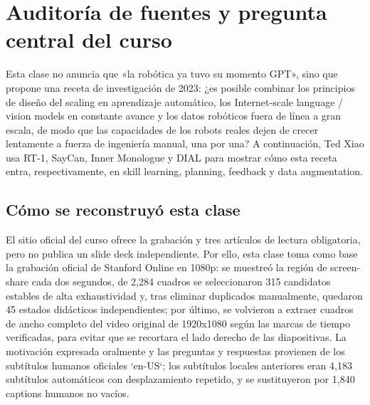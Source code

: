\documentclass[a4paper]{article}
\begin{document}
\makecscover

\section{Auditoría de fuentes y pregunta central del curso}

Esta clase no anuncia que «la robótica ya tuvo su momento GPT», sino que propone una receta de investigación de 2023: ¿es posible combinar los principios de diseño del scaling en aprendizaje automático, los Internet-scale language / vision models en constante avance y los datos robóticos fuera de línea a gran escala, de modo que las capacidades de los robots reales dejen de crecer lentamente a fuerza de ingeniería manual, una por una? A continuación, Ted Xiao usa RT-1, SayCan, Inner Monologue y DIAL para mostrar cómo esta receta entra, respectivamente, en skill learning, planning, feedback y data augmentation.

\subsection{Cómo se reconstruyó esta clase}

El sitio oficial del curso ofrece la grabación y tres artículos de lectura obligatoria, pero no publica un slide deck independiente. Por ello, esta clase toma como base la grabación oficial de Stanford Online en 1080p: se muestreó la región de screen-share cada dos segundos, de 2,284 cuadros se seleccionaron 315 candidatos estables de alta exhaustividad y, tras eliminar duplicados manualmente, quedaron 45 estados didácticos independientes; por último, se volvieron a extraer cuadros de ancho completo del video original de 1920x1080 según las marcas de tiempo verificadas, para evitar que se recortara el lado derecho de las diapositivas. La motivación expresada oralmente y las preguntas y respuestas provienen de los subtítulos humanos oficiales `en-US`; los subtítulos locales anteriores eran 4,183 subtítulos automáticos con desplazamiento repetido, y se sustituyeron por 1,840 captions humanos no vacíos.
\end{document}
